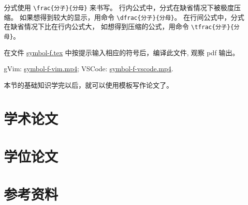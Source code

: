 \documentclass[
    11pt,
    base=hide,
    cite=authoryear,
    device=phone,
    lang=cn,
    mode=simple,
    result=answer,
    toc=onecol,
]{elegantsierxue310}
\begin{document}
分式使用 \lstinline|\frac{分子}{分母}| 来书写。
行内公式中，分式在缺省情况下被极度压缩。
如果想得到较大的显示，用命令 \lstinline|\dfrac{分子}{分母}|。
在行间公式中，分式在缺省情况下比在行内公式大，
如想得到压缩的公式，用命令 \lstinline|\tfrac{分子}{分母}|。
\begin{exercise}\label{exe:symbol-f}
    在文件
    \href{learn-latex/basic-03/symbol-f.tex}{symbol-f.tex}
    中按提示输入相应的符号后，编译此文件, 观察 pdf 输出。
\end{exercise}
\begin{cast}\label{cast:symbol-f}
    gVim: \href{media/casts/symbol-f-vim.mp4}{symbol-f-vim.mp4};
    VSCode: \href{media/casts/symbol-f-vscode.mp4}{symbol-f-vscode.mp4}.
\end{cast}

本节的基础知识学完以后，就可以使用模板写作论文了。

\newpage
\section{学术论文}%
\label{sec:latex-paper}

\newpage
\section{学位论文}%
\label{sec:latex-thesis}

\newpage
\section{参考资料}%
\label{sec:latex-refs}
\end{document}
